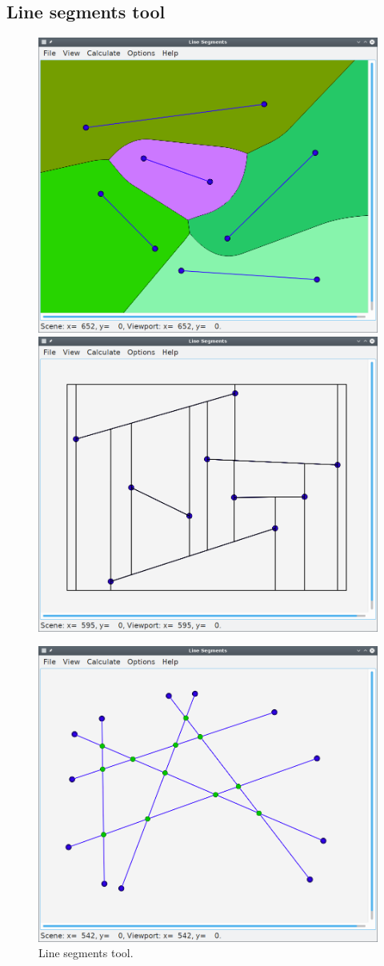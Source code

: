 \subsection{Line segments tool}
\begin{figure}[htb]
	\centering
	\includegraphics[width = 0.49 \textwidth]{figures/linesgui_voro}
	\hspace{0.05cm}
	\includegraphics[width = 0.49 \textwidth]{figures/linesgui_trapezoid}

	\vspace{0.25cm}
	\includegraphics[width = 0.49 \textwidth]{figures/linesgui_inters}
	\caption[Line segments tool.]{Line segments tool.
		\label{fig:linesgui}}
\end{figure}



